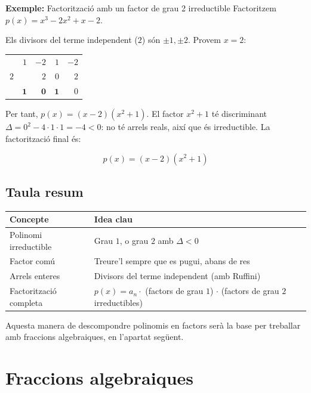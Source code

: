 \begin{exemple}{\textbf{Exemple:} Factorització amb un factor de grau 2 irreductible}
Factoritzem $p(x) = x^3-2x^2+x-2$.

Els divisors del terme independent ($2$) són $\pm 1,\pm 2$. Provem $x=2$:

\begin{center}
\renewcommand{\arraystretch}{1.25}
\begin{tabular}{r|rrrr}
 & $1$ & $-2$ & $1$ & $-2$ \\
$2$ &  & $2$ & $0$ & $2$ \\ \hline
 & $\textbf{1}$ & $\textbf{0}$ & $\textbf{1}$ & $\boxed{0}$ \\
\end{tabular}
\end{center}

Per tant, $p(x) = (x-2)(x^2+1)$. El factor $x^2+1$ té discriminant $\Delta = 0^2-4\cdot 1\cdot 1=-4<0$: no té arrels reals, així que és irreductible. La factorització final és:

\[
p(x) = (x-2)(x^2+1)
\]
\end{exemple}

\subsection{Taula resum}

\begin{center}
\begin{tabularx}{\linewidth}{lY}
\toprule
\textbf{Concepte} & \textbf{Idea clau} \\
\midrule
Polinomi irreductible & Grau $1$, o grau $2$ amb $\Delta<0$ \\
Factor comú & Treure'l sempre que es pugui, abans de res \\
Arrels enteres & Divisors del terme independent (amb Ruffini) \\
Factorització completa & $p(x)=a_n\cdot$ (factors de grau $1$) $\cdot$ (factors de grau $2$ irreductibles) \\
\bottomrule
\end{tabularx}
\end{center}

Aquesta manera de descompondre polinomis en factors serà la base per treballar amb fraccions algebraiques, en l'apartat següent.

\section{Fraccions algebraiques}

